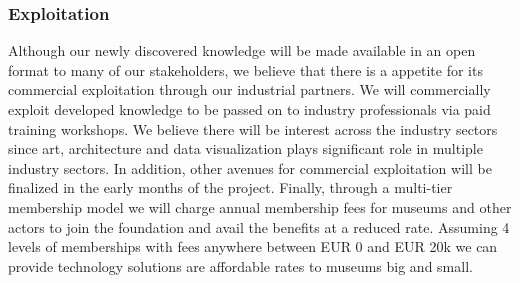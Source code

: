\subsubsection{Exploitation}
Although our newly discovered knowledge will be made available in an open format to many of our stakeholders, we believe that there is a appetite for its commercial exploitation through our industrial partners. We will commercially exploit developed knowledge to be passed on to industry professionals via paid training workshops. We believe there will be interest across the industry sectors since art, architecture and data visualization plays significant role in multiple industry sectors. In addition, other avenues for commercial exploitation will be finalized in the early months of the project. Finally, through a multi-tier membership model we will charge annual membership fees for museums and other actors to join the foundation and avail the benefits at a reduced rate. Assuming 4 levels of memberships with fees anywhere between EUR 0 and EUR 20k we can provide technology solutions are affordable rates to museums big and small.

